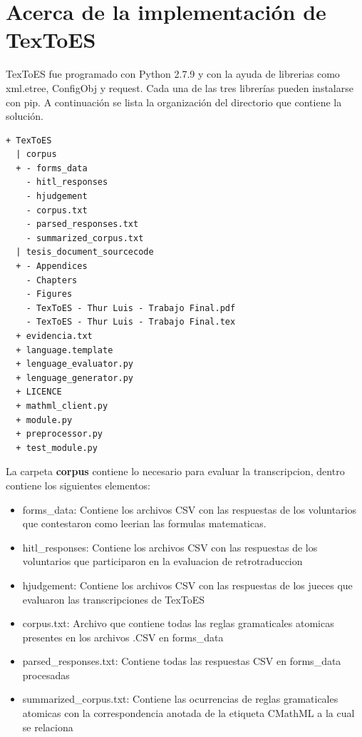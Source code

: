 \chapter{Acerca de la implementación de TexToES}

\label{AppendixA}

TexToES fue programado con Python 2.7.9 y con la ayuda de librerias como xml.etree, ConfigObj y request. Cada una de las tres librerías pueden instalarse con pip.
A continuación se lista la organización del directorio que contiene la solución.

\begin{lstlisting}[basicstyle=\scriptsize]
+ TexToES
  | corpus
  + - forms_data
    - hitl_responses
    - hjudgement
    - corpus.txt
    - parsed_responses.txt
    - summarized_corpus.txt
  | tesis_document_sourcecode
  + - Appendices
    - Chapters
    - Figures
    - TexToES - Thur Luis - Trabajo Final.pdf
    - TexToES - Thur Luis - Trabajo Final.tex
  + evidencia.txt
  + language.template
  + lenguage_evaluator.py
  + lenguage_generator.py
  + LICENCE
  + mathml_client.py
  + module.py
  + preprocessor.py
  + test_module.py
\end{lstlisting}

La carpeta \textbf{corpus} contiene lo necesario para evaluar la transcripcion, dentro contiene los siguientes elementos:
\begin{itemize}
\item forms\_data: Contiene los archivos CSV con las respuestas de los voluntarios que contestaron como leerian las formulas matematicas.
\item hitl\_responses: Contiene los archivos CSV con las respuestas de los voluntarios que participaron en la evaluacion de retrotraduccion
\item hjudgement: Contiene los archivos CSV con las respuestas de los jueces  que evaluaron las transcripciones de TexToES
\item corpus.txt: Archivo que contiene todas las reglas gramaticales atomicas presentes en los archivos .CSV en forms\_data
\item parsed\_responses.txt: Contiene todas las respuestas CSV en forms\_data procesadas
\item summarized\_corpus.txt: Contiene las ocurrencias de reglas gramaticales atomicas con la correspondencia anotada de la etiqueta CMathML a la cual se relaciona
\end{itemize}

